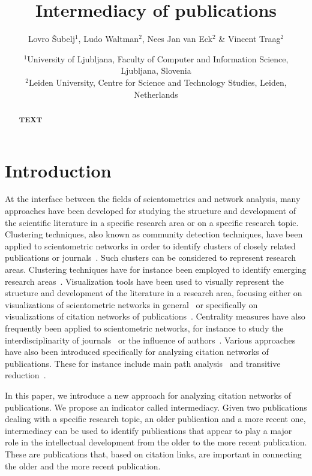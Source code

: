 \documentclass{article}
\title{Intermediacy of publications}
\author{Lovro \v{S}ubelj$^1$, Ludo Waltman$^2$, Nees Jan van Eck$^2$ \& Vincent Traag$^2$}
\date{\small $^1$University of Ljubljana, Faculty of Computer and Information Science, Ljubljana, Slovenia\\
$^2$Leiden University, Centre for Science and Technology Studies, Leiden, Netherlands}
\theoremstyle{definition}
\newcommand{\lips}[1]{{\bf\color{orange}TEXT}~\emph{\color{gray}\lipsum[#1]}}
\begin{document}
\maketitle

%
%

\begin{abstract}
	\lips{1}
\end{abstract}

%
%

\section{\label{sec:introduction}Introduction}

At the interface between the fields of scientometrics and network analysis, many approaches have been developed for studying the structure and development of the scientific literature in a specific research area or on a specific research topic. Clustering techniques, also known as community detection techniques, have been applied to scientometric networks in order to identify clusters of closely related publications or journals~\citep[e.g.,][]{Boyack2010,Rosvall2008,Waltman2012}. Such clusters can be considered to represent research areas. Clustering techniques have for instance been employed to identify emerging research areas~\cite{Small2014,Wang2018}. Visualization tools have been used to visually represent the structure and development of the literature in a research area, focusing either on visualizations of scientometric networks in general~\cite{Chen2006,VanEck2010} or specifically on visualizations of citation networks of publications~\cite{Garfield2003,VanEck2014}. Centrality measures have also frequently been applied to scientometric networks, for instance to study the interdisciplinarity of journals~\cite{Leydesdorff2007} or the influence of authors~\cite{Newman2001}. Various approaches have also been introduced specifically for analyzing citation networks of publications. These for instance include main path analysis~\cite{Hummon1989} and transitive reduction~\cite{Clough2015}.

In this paper, we introduce a new approach for analyzing citation networks of publications. We propose an indicator called intermediacy. Given two publications dealing with a specific research topic, an older publication and a more recent one, intermediacy can be used to identify publications that appear to play a major role in the intellectual development from the older to the more recent publication. These are publications that, based on citation links, are important in connecting the older and the more recent publication.
\end{document}
